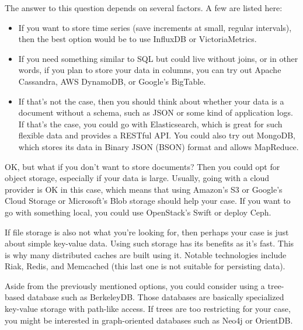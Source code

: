 

The answer to this question depends on several factors. A few are listed here:


\begin{itemize}
\item 
If you want to store time series (save increments at small, regular intervals), then the best option would be to use InfluxDB or VictoriaMetrics.

\item
If you need something similar to SQL but could live without joins, or in other words, if you plan to store your data in columns, you can try out Apache Cassandra, AWS DynamoDB, or Google's BigTable.

\item
If that's not the case, then you should think about whether your data is a document without a schema, such as JSON or some kind of application logs. If that's the case, you could go with Elasticsearch, which is great for such flexible data and provides a RESTful API. You could also try out MongoDB, which stores its data in Binary JSON (BSON) format and allows MapReduce.
\end{itemize}

OK, but what if you don't want to store documents? Then you could opt for object storage, especially if your data is large. Usually, going with a cloud provider is OK in this case, which means that using Amazon's S3 or Google's Cloud Storage or Microsoft's Blob storage should help your case. If you want to go with something local, you could use OpenStack's Swift or deploy Ceph.

If file storage is also not what you're looking for, then perhaps your case is just about simple key-value data. Using such storage has its benefits as it's fast. This is why many distributed caches are built using it. Notable technologies include Riak, Redis, and Memcached (this last one is not suitable for persisting data).

Aside from the previously mentioned options, you could consider using a tree-based database such as BerkeleyDB. Those databases are basically specialized key-value storage with path-like access. If trees are too restricting for your case, you might be interested in graph-oriented databases such as Neo4j or OrientDB.







